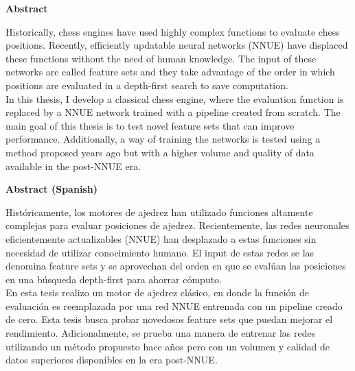 \thispagestyle{plain}
\begin{center}
\large
\textbf{Abstract}
\end{center}

\begin{center}
\parbox{15cm}{
Historically, chess engines have used highly complex functions to evaluate chess positions. Recently, efficiently updatable neural networks (NNUE) have displaced these functions without the need of human knowledge. The input of these networks are called feature sets and they take advantage of the order in which positions are evaluated in a depth-first search to save computation. \\

In this thesis, I develop a classical chess engine, where the evaluation function is replaced by a NNUE network trained with a pipeline created from scratch. The main goal of this thesis is to test novel feature sets that can improve performance. Additionally, a way of training the networks is tested using a method proposed years ago but with a higher volume and quality of data available in the post-NNUE era.
}
\end{center}

\vspace{1cm}

\begin{center}
\large
\textbf{Abstract (Spanish)}
\end{center}

\begin{center}
\parbox{15cm}{
Históricamente, los motores de ajedrez han utilizado funciones altamente complejas para evaluar posiciones de ajedrez. Recientemente, las redes neuronales eficientemente actualizables (NNUE) han desplazado a estas funciones sin necesidad de utilizar conocimiento humano. El input de estas redes se las denomina feature sets y se aprovechan del orden en que se evalúan las posiciones en una búsqueda depth-first para ahorrar cómputo. \\

En esta tesis realizo un motor de ajedrez clásico, en donde la función de evaluación es reemplazada por una red NNUE entrenada con un pipeline creado de cero. Esta tesis busca probar novedosos feature sets que puedan mejorar el rendimiento. Adicionalmente, se prueba una manera de entrenar las redes utilizando un método propuesto hace años pero con un volumen y calidad de datos superiores disponibles en la era post-NNUE.
}
\end{center}

\clearpage
